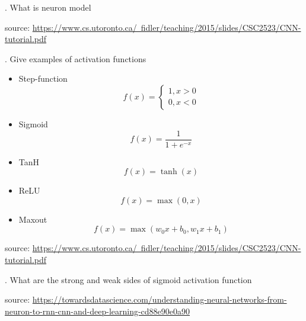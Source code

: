 \documentclass{article}
\newcounter{question}
\begin{document}
\newcommand\Que[1]{%
    
    \leavevmode\par
   \noindent
   \thequestion. \Large #1\par}

\Que{What is neuron model}

\small source: \href{https://www.cs.utoronto.ca/~fidler/teaching/2015/slides/CSC2523/CNN-tutorial.pdf}{https://www.cs.utoronto.ca/~fidler/teaching/2015/slides/CSC2523/CNN-tutorial.pdf}

\Que{Give examples of activation functions}

\begin{itemize}
    \item Step-function $$f(x)=\begin{cases} 1, x>0 \\ 0,  x<0 \end{cases}$$
    \item Sigmoid $$f(x)=\frac{1}{1+e^{-x}}$$
    \item TanH $$ f(x)=\tanh(x)$$
    \item ReLU $$f(x)=\max(0,x)$$
    \item Maxout $$f(x) = \max(w_0x + b_0, w_1x + b_1)$$
\end{itemize}
\small source: \href{https://www.cs.utoronto.ca/~fidler/teaching/2015/slides/CSC2523/CNN-tutorial.pdf}{https://www.cs.utoronto.ca/~fidler/teaching/2015/slides/CSC2523/CNN-tutorial.pdf}

\Que{What are the strong and weak sides of sigmoid activation function}

\small source: \href{https://towardsdatascience.com/understanding-neural-networks-from-neuron-to-rnn-cnn-and-deep-learning-cd88e90e0a90}{https://towardsdatascience.com/understanding-neural-networks-from-neuron-to-rnn-cnn-and-deep-learning-cd88e90e0a90}
\end{document}
